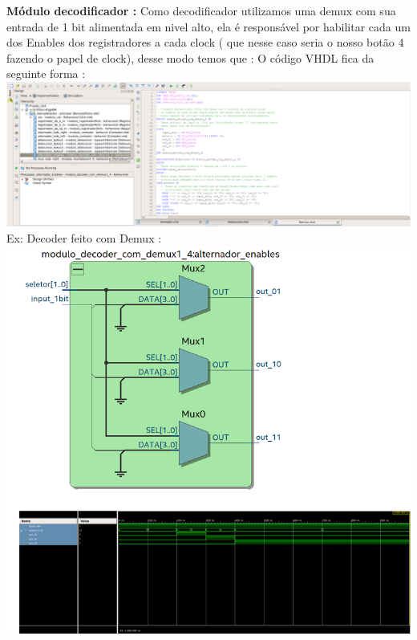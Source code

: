 \documentclass[11pt]{book}
\begin{document}
\textbf{Módulo decodificador :} 
\newline\newline
Como decodificador utilizamos uma demux com sua entrada de 1 bit alimentada em nivel alto, ela é responsável por habilitar cada um dos Enables dos registradores a cada clock ( que nesse caso seria o nosso botão 4 fazendo o papel de clock), desse modo temos que : 
\newline
O código VHDL fica da seguinte forma :
\newline\newline
\includegraphics[width=1.1\textwidth]{codigo_demuxdecoder.png}%
\newline
 Ex: Decoder feito com Demux :
\newline\newline
\includegraphics[width=1.1\textwidth]{RTL_demux_decoder_simulacao_decoderDEMUX.png}%
\newline
\end{document}
